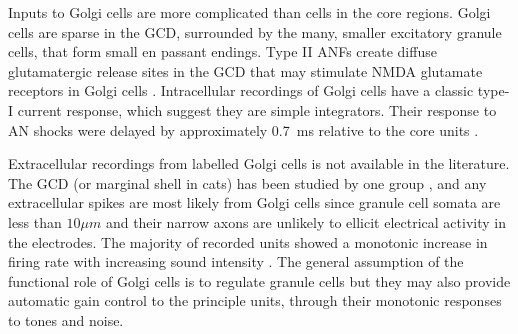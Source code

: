 


 Inputs to Golgi cells are more complicated than \VCN cells in the core
 regions. Golgi cells are sparse in the GCD, surrounded by the many, smaller
 excitatory granule cells, that form small en passant endings. Type II ANFs
 create diffuse glutamatergic release sites in the GCD
 \citep{HurdHutsonEtAl:1999,BensonBrown:2004} that may stimulate NMDA glutamate
 receptors in Golgi cells \citep{FerragamoGoldingEtAl:1998a}.  Intracellular
 recordings of Golgi cells have a classic type-I current response, which suggest
 they are simple integrators. Their response to AN shocks were delayed by
 approximately 0.7~ms relative to the core \VCN units
 \citep{FerragamoGoldingEtAl:1998}.


 Extracellular recordings from labelled Golgi cells is not available in the
 literature.  The GCD (or marginal shell in cats) has been studied by one group
 \citet{GhoshalKim:1997}, and any extracellular spikes are most likely from
 Golgi cells since granule cell somata are less than $10{}\mu{m}$ and their
 narrow axons are unlikely to ellicit electrical activity in the electrodes. The
 majority of recorded units showed a monotonic increase in firing rate with
 increasing sound intensity
 \citep[Figure~\ref{fig:GolgiKimFig2}][]{GhoshalKim:1997}.  The general
 assumption of the functional role of Golgi cells is to regulate granule cells
 but they may also provide automatic gain control to the principle \VCN units,
 through their monotonic responses to tones and noise.


